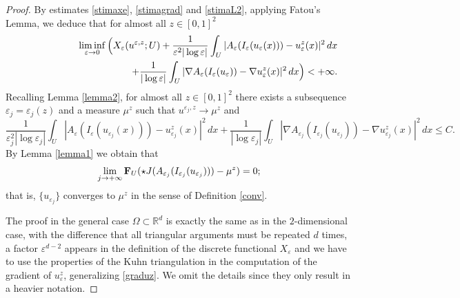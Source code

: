 \documentclass[11pt]{article}
\def\e{\varepsilon}
\begin{document}
\begin{proof}
By estimates \eqref{stimaxe}, \eqref{stimagrad} and \eqref{stimaL2}, applying Fatou's Lemma, we deduce that 
for almost all $z\in[0,1]^2$ 
\begin{eqnarray}\label{3}
 &&\liminf_{\e\to 0}\Big(X_\e(u^{\e,z};U)+\frac{1}{\e^2|\log\e|}\int_U| A_\e(I_\e(u_\e (x))) - u^z_\e(x)|^2\, dx\nonumber\\
 &&\hspace{3.7cm}+
 \frac{1}{|\log\e|}\int_U| \nabla A_\e(I_\e(u_\e)) - \nabla u^z_\e(x)|^2\, dx\Big)<+\infty.
\end{eqnarray}
Recalling Lemma \ref{lemma2}, 
for almost all $z\in[0,1]^2$ there exists a subsequence $\e_j=\e_j(z)$ and a measure $\mu^z$ such that $u^{\e_j,z}\to\mu^z$ and 
$$\frac{1}{\e_j^2|\log\e_j|}\int_U| A_\e(I_\e(u_{\e_j} (x))) - u^z_{\e_j}(x)|^2\, dx+
 \frac{1}{|\log\e_j|}\int_U| \nabla A_{\e_j}(I_{\e_j}(u_{\e_j})) - \nabla u^z_{\e_j}(x)|^2\, dx\le C.$$
By Lemma \ref{lemma1} we obtain that 
\begin{equation}\label{muz}
\lim_{j\to +\infty}{\bf F}_U(\star J(A_{\e_j}(I_{\e_j}(u_{\e_j})))-\mu^z)=0;
\end{equation}
that is, $\{u_{\e_j}\}$ converges to $\mu^z$ in the sense of Definition \ref{conv}.

\bigskip 

The proof in the general case $\Omega\subset \mathbb R^d$ is exactly the same as in the $2$-dimensional case, with the difference that all triangular arguments must be repeated $d$ times, a factor $\e^{d-2}$ appears in the definition of the discrete functional $X_\e$ and we have to use the properties of the Kuhn triangulation in the computation of the gradient of $u_\e^z$, generalizing \eqref{graduz}. We omit the details since they only result in  a heavier notation.  
\end{proof}
\end{document}
